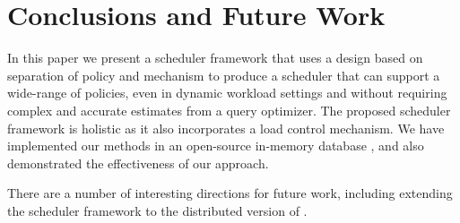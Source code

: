 \section{Conclusions and Future Work}\label{sec:conclusion}
In this paper we present a scheduler framework that uses a design based on separation of policy and mechanism to produce a scheduler that can support a wide-range of policies, even in dynamic workload settings and without requiring complex and accurate estimates from a query optimizer. The proposed scheduler framework is holistic as it also incorporates a load control mechanism. We have implemented our methods in an open-source in-memory database \sys{}, and also demonstrated the effectiveness of our approach.



There are a number of interesting directions for future work, including extending the scheduler framework to the distributed version of \sys{}. %